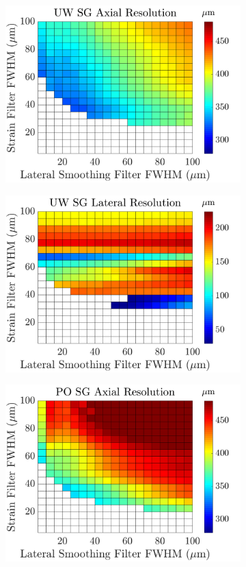 \begin{figure}[b!]
\begin{subfigure}{0.49\textwidth}
		\includegraphics[width=\textwidth]{imageres_figs/uwsg_axial.png}
	\end{subfigure}
	\begin{subfigure}{0.49\textwidth}
		\centering
		\includegraphics[width=\textwidth]{imageres_figs/uwsg_lateral.png}
	\end{subfigure}
	\begin{subfigure}{0.49\textwidth}
		\centering
		\includegraphics[width=\textwidth]{imageres_figs/posg_axial.png}

\end{subfigure}
\end{figure}
